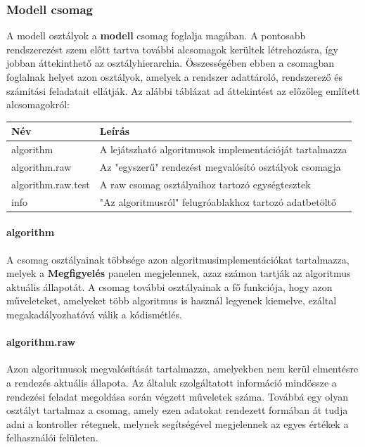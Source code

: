 \documentclass{elteikthesis}
\begin{document}
\subsubsection{Modell csomag}
A modell osztályok a \textbf{modell} csomag foglalja magában. A pontosabb rendszerezést szem előtt tartva további alcsomagok kerültek létrehozásra, így jobban áttekinthető az osztályhierarchia. Összességében ebben a csomagban foglalnak helyet azon osztályok, amelyek a rendszer adattároló, rendszerező és számítási feladatait ellátják. Az alábbi táblázat ad áttekintést az előzőleg említett alcsomagokról:\par
\begin{table}[H]
	\def\arraystretch{2}
	\centering
	\begin{tabular}{|l|l|}
		\hline
		\textbf{Név}  & \textbf{Leírás}                                                                          \\ \hline
		algorithm     & A lejátszható algoritmusok implementációját tartalmazza                       \\ \hline
		algorithm.raw & Az "egyszerű" rendezést megvalósító osztályok csomagja\\ \hline
		algorithm.raw.test & A raw csomag osztályaihoz tartozó egységtesztek\\ \hline
		info         & "Az algoritmusról" felugróablakhoz tartozó adatbetöltő                         \\ \hline
	\end{tabular}
\end{table}
\paragraph{algorithm}
A csomag osztályainak többsége azon algoritmusimplementációkat tartalmazza, melyek a \textbf{Megfigyelés} panelen megjelennek, azaz számon tartják az algoritmus aktuális állapotát. A csomag további osztályainak a fő funkciója, hogy azon műveleteket, amelyeket több algoritmus is használ legyenek kiemelve, ezáltal megakadályozhatóvá válik a kódismétlés.
\paragraph{algorithm.raw}
Azon algoritmusok megvalósítását tartalmazza, amelyekben nem kerül elmentésre a rendezés aktuális állapota. Az általuk szolgáltatott információ mindössze a rendezési feladat megoldása során végzett műveletek száma. Továbbá egy olyan osztályt tartalmaz a csomag, amely ezen adatokat rendezett formában át tudja adni a kontroller rétegnek, melynek segítségével megjelennek az egyes értékek a felhasználói felületen.
\end{document}
